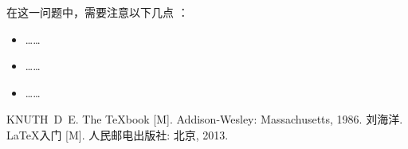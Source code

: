 \documentclass[
    10pt,
    oneside,
    openany,
    b5paper,
    colorscheme = basic  %
]{qyxf-book}
\begin{document}
\analysis 在这一问题中，需要注意以下几点 \cite{texbook,latex}：
\begin{itemize}
    \item ……
    \item ……
    \item ……
\end{itemize}

\begin{thebibliography}{99}
 KNUTH~D~E. The \TeX book [M]. Addison-Wesley: Massachusetts, 1986.
 刘海洋. \LaTeX 入门 [M]. 人民邮电出版社: 北京, 2013.
\end{thebibliography}
\end{document}
